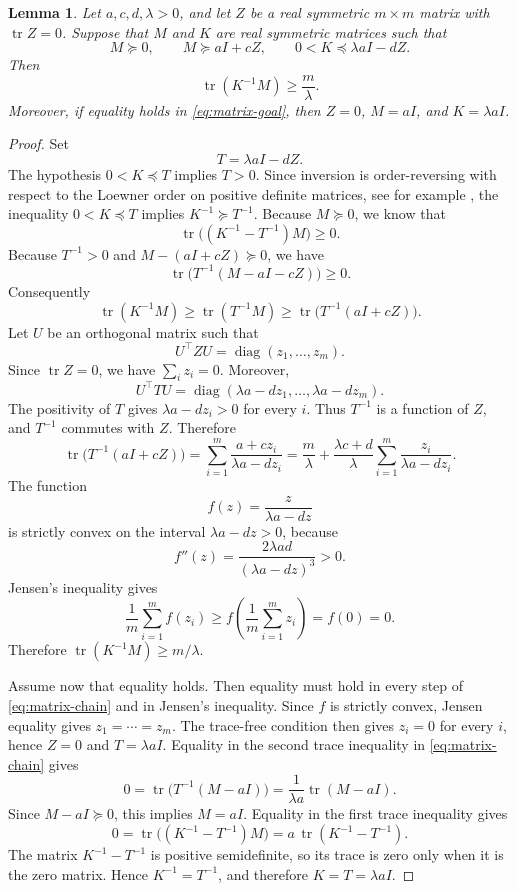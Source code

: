 \documentclass[11pt,letterpaper,reqno]{amsart}
\newtheorem{lemma}[theorem]{Lemma}
\theoremstyle{definition}
\DeclareMathOperator{\tr}{tr}
\begin{document}
\begin{lemma}\label{lem:matrix-Jensen}
Let \(a,c,d,\lambda>0\), and let \(Z\) be a real symmetric \(m\times m\)
matrix with \(\tr Z=0\). Suppose that \(M\) and \(K\) are real symmetric
matrices such that
\[
        M\succeq0,
        \qquad
        M\succeq aI+cZ,
        \qquad
        0<K\preceq \lambda aI-dZ.
\]
Then
\begin{equation}\label{eq:matrix-goal}
        \tr(K^{-1}M)\geq \frac{m}{\lambda}.
\end{equation}
Moreover, if equality holds in \eqref{eq:matrix-goal}, then \(Z=0\),
\(M=aI\), and \(K=\lambda aI\).
\end{lemma}

\begin{proof}
Set
\[
        T=\lambda aI-dZ.
\]
The hypothesis \(0<K\preceq T\) implies \(T>0\). Since inversion is order-reversing with respect to the Loewner order on positive definite matrices, see for example \cite[Proposition V.1.6]{Bhatia97}, the inequality \(0<K\preceq T\) implies $K^{-1}\succeq T^{-1}$. Because \(M\succeq0\), we know that
\[
        \tr\bigl((K^{-1}-T^{-1})M\bigr)\geq0.
\]
Because \(T^{-1}>0\) and \(M-(aI+cZ)\succeq0\), we have
\[
        \tr\bigl(T^{-1}(M-aI-cZ)\bigr)\geq0.
\]
Consequently
\begin{equation}\label{eq:matrix-chain}
\tr(K^{-1}M)
\geq \tr(T^{-1}M)
\geq \tr\bigl(T^{-1}(aI+cZ)\bigr).
\end{equation}
Let \(U\) be an orthogonal matrix such that
\[
        U^\top  ZU=\operatorname{diag}(z_1,\ldots,z_m).
\]
Since \(\tr Z=0\), we have \(\sum_i z_i=0\). Moreover,
\[
        U^\top  T U
        =
        \operatorname{diag}(\lambda a-dz_1,\ldots,\lambda a-dz_m).
\]
The positivity of \(T\) gives \(\lambda a-dz_i>0\) for every \(i\). Thus
\(T^{-1}\) is a function of \(Z\), and \(T^{-1}\) commutes with \(Z\).
Therefore
\[
\tr\bigl(T^{-1}(aI+cZ)\bigr)
= \sum_{i=1}^m \frac{a+cz_i}{\lambda a-dz_i}
=\frac{m}{\lambda} + \frac{\lambda c+d}{\lambda}
\sum_{i=1}^m\frac{z_i}{\lambda a-dz_i}.
\]
The function
\[
        f(z)=\frac{z}{\lambda a-dz}
\]
is strictly convex on the interval \(\lambda a-dz>0\), because
\[
        f''(z)=\frac{2\lambda ad}{(\lambda a-dz)^3}>0.
\]
Jensen's inequality gives
\[
        \frac1m\sum_{i=1}^m f(z_i)
        \geq
        f\left(\frac1m\sum_{i=1}^m z_i\right)
        =f(0)=0.
\]
Therefore \(\tr(K^{-1}M)\geq m/\lambda\).

Assume now that equality holds. Then equality must hold in every step of
\eqref{eq:matrix-chain} and in Jensen's inequality. Since \(f\) is
strictly convex, Jensen equality gives \(z_1=\cdots=z_m\). The trace-free
condition then gives \(z_i=0\) for every \(i\), hence \(Z=0\) and
\(T=\lambda aI\). Equality in the second trace inequality in
\eqref{eq:matrix-chain} gives
\[
        0=\tr\bigl(T^{-1}(M-aI)\bigr)
        =\frac{1}{\lambda a}\tr(M-aI).
\]
Since \(M-aI\succeq0\), this implies \(M=aI\). Equality in the first trace
inequality gives
\[
        0=\tr\bigl((K^{-1}-T^{-1})M\bigr)
        =a\,\tr(K^{-1}-T^{-1}).
\]
The matrix \(K^{-1}-T^{-1}\) is positive semidefinite, so its trace is zero
only when it is the zero matrix. Hence \(K^{-1}=T^{-1}\), and therefore
\(K=T=\lambda aI\).
\end{proof}
\end{document}
